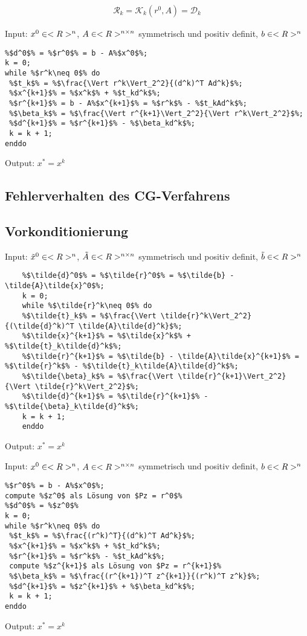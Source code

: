 \begin{align}
	\label{2_23}
	\mathcal{R}_k = \mathcal{K}_k(r^0,A)=\mathcal{D}_k
\end{align}

\begin{algorithm}[CG-Verfahren]
	Input: $x^0\in<R>^n$, $A\in<R>^{n \times n}$ symmetrisch und positiv definit, $b\in<R>^n$
	\begin{lstlisting}
%$d^0$% = %$r^0$% = b - A%$x^0$%;
k = 0;
while %$r^k\neq 0$% do
 %$t_k$% = %$\frac{\Vert r^k\Vert_2^2}{(d^k)^T Ad^k}$%;
 %$x^{k+1}$% = %$x^k$% + %$t_kd^k$%;
 %$r^{k+1}$% = b - A%$x^{k+1}$% = %$r^k$% - %$t_kAd^k$%;
 %$\beta_k$% = %$\frac{\Vert r^{k+1}\Vert_2^2}{\Vert r^k\Vert_2^2}$%;
 %$d^{k+1}$% = %$r^{k+1}$% - %$\beta_kd^k$%;
 k = k + 1;
enddo
	\end{lstlisting}
	Output: $x^\ast=x^k$
\end{algorithm}

\subsection{Fehlerverhalten des CG-Verfahrens}

\subsection{Vorkonditionierung}

\begin{algorithm}[CG-Verfahren für $\tilde{A}\tilde{x}=\tilde{b}$]
	Input: $\tilde{x}^0\in<R>^n$, $\tilde{A}\in<R>^{n \times n}$ symmetrisch und positiv definit, $\tilde{b}\in<R>^n$
	\begin{lstlisting}
	%$\tilde{d}^0$% = %$\tilde{r}^0$% = %$\tilde{b} - \tilde{A}\tilde{x}^0$%;
	k = 0;
	while %$\tilde{r}^k\neq 0$% do
	%$\tilde{t}_k$% = %$\frac{\Vert \tilde{r}^k\Vert_2^2}{(\tilde{d}^k)^T \tilde{A}\tilde{d}^k}$%;
	%$\tilde{x}^{k+1}$% = %$\tilde{x}^k$% + %$\tilde{t}_k\tilde{d}^k$%;
	%$\tilde{r}^{k+1}$% = %$\tilde{b} - \tilde{A}\tilde{x}^{k+1}$% = %$\tilde{r}^k$% - %$\tilde{t}_k\tilde{A}\tilde{d}^k$%;
	%$\tilde{\beta}_k$% = %$\frac{\Vert \tilde{r}^{k+1}\Vert_2^2}{\Vert \tilde{r}^k\Vert_2^2}$%;
	%$\tilde{d}^{k+1}$% = %$\tilde{r}^{k+1}$% - %$\tilde{\beta}_k\tilde{d}^k$%;
	k = k + 1;
	enddo
	\end{lstlisting}
	Output: $x^\ast=x^k$
\end{algorithm}

\begin{algorithm}
	Input: $x^0\in<R>^n$, $A\in<R>^{n \times n}$ symmetrisch und positiv definit, $b\in<R>^n$
	\begin{lstlisting}
%$r^0$% = b - A%$x^0$%;
compute %$z^0$ als Lösung von $Pz = r^0$% 
%$d^0$% = %$z^0$%
k = 0;
while %$r^k\neq 0$% do
 %$t_k$% = %$\frac{(r^k)^T}{(d^k)^T Ad^k}$%;
 %$x^{k+1}$% = %$x^k$% + %$t_kd^k$%;
 %$r^{k+1}$% = %$r^k$% - %$t_kAd^k$%;
 compute %$z^{k+1}$ als Lösung von $Pz = r^{k+1}$%
 %$\beta_k$% = %$\frac{(r^{k+1})^T z^{k+1}}{(r^k)^T z^k}$%;
 %$d^{k+1}$% = %$z^{k+1}$% + %$\beta_kd^k$%;
 k = k + 1;
enddo
	\end{lstlisting}
	Output: $x^\ast=x^k$
\end{algorithm}

